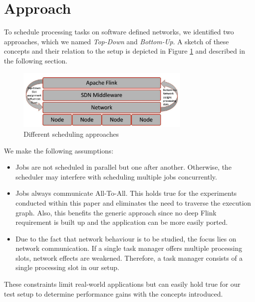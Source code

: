 \section{Approach}
To schedule processing tasks on software defined networks, we identified two approaches, which we
named \textit{Top-Down} and \textit{Bottom-Up}. A sketch of these concepts and their relation to the
setup is depicted in Figure \ref{fig:schedulingapproaches} and described in the following section.

\begin{figure}[h]
    \centering
    \includegraphics[width=0.75\textwidth]{graphics/schedulingapproaches.png}
    \caption{Different scheduling approaches}
    \label{fig:schedulingapproaches}
\end{figure}

We make the following assumptions:
\begin{itemize}
\item Jobs are not scheduled in parallel but one after another. Otherwise, the scheduler may
interfere with scheduling multiple jobs concurrently.

\item Jobs always communicate All-To-All. This holds true for the experiments conducted within this
paper and eliminates the need to traverse the execution graph. Also, this benefits the generic
approach since no deep Flink requirement is built up and the application can be more easily ported.

\item Due to the fact that network behaviour is to be studied, the focus lies on network
communication. If a single task manager offers multiple processing slots, network effects are
weakened. Therefore, a task manager consists of a single processing slot in our setup.
\end{itemize}

These constraints limit real-world applications but can easily hold true for our test setup to
determine performance gains with the concepts introduced.

